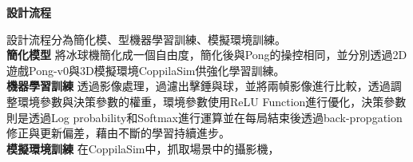 
\begin{flushleft}
\textbf{設計流程}\\
\end{flushleft}
設計流程分為簡化模、型機器學習訓練、模擬環境訓練。\\
\textbf{簡化模型}
將冰球機簡化成一個自由度，簡化後與Pong的操控相同，並分別透過2D遊戲Pong-v0與3D模擬環境CoppilaSim供強化學習訓練。\\

\textbf{機器學習訓練}
透過影像處理，過濾出擊錘與球，並將兩幀影像進行比較，透過調整環境參數與決策參數的權重，環境參數使用ReLU Function進行優化，決策參數則是透過Log probability和Softmax進行運算並在每局結束後透過back-propgation修正與更新偏差，藉由不斷的學習持續進步。\\

\textbf{模擬環境訓練}
在CoppilaSim中，抓取場景中的攝影機，